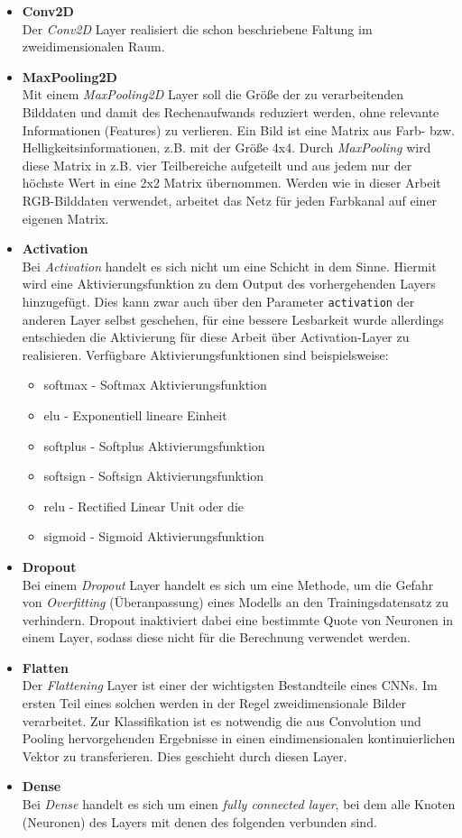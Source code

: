 \begin{itemize}
	\item \textbf{Conv2D}\\
	Der \textit{Conv2D} Layer realisiert die schon beschriebene Faltung im zweidimensionalen Raum.
	\item \textbf{MaxPooling2D} \\
	Mit einem \textit{MaxPooling2D} Layer soll die Größe der zu verarbeitenden Bilddaten und damit des Rechenaufwands reduziert werden, ohne relevante Informationen (Features) zu verlieren. Ein Bild ist eine Matrix aus Farb- bzw. Helligkeitsinformationen, z.B. mit der Größe 4x4. Durch \textit{MaxPooling} wird diese Matrix in z.B. vier Teilbereiche aufgeteilt und aus jedem nur der höchste Wert in eine 2x2 Matrix übernommen. Werden wie in dieser Arbeit RGB-Bilddaten verwendet, arbeitet das Netz für jeden Farbkanal auf einer eigenen Matrix.
	\item \textbf{Activation} \\
	Bei \textit{Activation} handelt es sich nicht um eine Schicht in dem Sinne. Hiermit wird eine Aktivierungsfunktion zu dem Output des vorhergehenden Layers hinzugefügt. Dies kann zwar auch über den Parameter \texttt{activation} der anderen Layer selbst geschehen, für eine bessere Lesbarkeit wurde allerdings entschieden die Aktivierung für diese Arbeit über Activation-Layer zu realisieren. Verfügbare Aktivierungsfunktionen sind beispielsweise: \begin{itemize}
		\item softmax - Softmax Aktivierungsfunktion
		\item elu - Exponentiell lineare Einheit
		\item softplus - Softplus Aktivierungsfunktion
		\item softsign - Softsign Aktivierungsfunktion
		\item relu - Rectified Linear Unit		oder die
		\item sigmoid - Sigmoid Aktivierungsfunktion		
	\end{itemize}
	\item \textbf{Dropout} \\
	Bei einem \textit{Dropout} Layer handelt es sich um eine Methode, um die Gefahr von \textit{Overfitting} (Überanpassung) eines Modells an den Trainingsdatensatz zu verhindern. Dropout inaktiviert dabei eine bestimmte Quote von Neuronen in einem Layer, sodass diese nicht für die Berechnung verwendet werden.
	\item \textbf{Flatten}\\
	Der \textit{Flattening} Layer ist einer der wichtigsten Bestandteile eines CNNs. Im ersten Teil eines solchen werden in der Regel zweidimensionale Bilder verarbeitet. Zur Klassifikation ist es notwendig die aus Convolution und Pooling hervorgehenden Ergebnisse in einen eindimensionalen kontinuierlichen Vektor zu transferieren. Dies geschieht durch diesen Layer. 
	\item \textbf{Dense} \\
	Bei \textit{Dense} handelt es sich um einen \textit{fully connected layer}, bei dem alle Knoten (Neuronen) des Layers mit denen des folgenden verbunden sind. 
	
\end{itemize}
